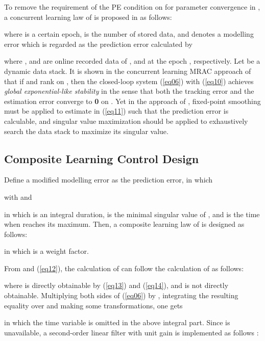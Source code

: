 \documentclass[conference]{IEEEtran}
\begin{document}
To remove the requirement of the PE condition on  for parameter convergence in \cite{Ioannou1996}, a concurrent learning law of  is proposed in \cite{Chowdhary2010a} as follows:

where  is a certain epoch,  is the number of stored data, and  denotes a modelling error which is regarded as the prediction error calculated by

where ,  and  are online recorded data of ,  and  at the epoch , respectively. Let   be a dynamic data stack. It is shown in the concurrent learning MRAC approach of \cite{Chowdhary2010a} that if   and rank on , then the closed-loop system (\ref{eq06}) with (\ref{eq10}) achieves \emph{global exponential-like stability} in the sense that both the tracking error  and the estimation error  converge to \textbf{0} on . Yet in the approach of \cite{Chowdhary2010a}, fixed-point smoothing must be applied to estimate  in (\ref{eq11}) such that the prediction error  is calculable, and singular value maximization should be applied to exhaustively search the data stack  to maximize its singular value.

\subsection{Composite Learning Control Design}

Define a modified modelling error  as the prediction error, in which

with  and

in which  is an integral duration,  is the minimal singular value of , and  is the time when  reaches its maximum\footnotemark[1]. Then, a composite learning law of  is designed as follows:

in which  is a weight factor.


From  and (\ref{eq12}), the calculation of  can follow the calculation of  as follows:

where  is directly obtainable by (\ref{eq13}) and (\ref{eq14}), and  is not directly obtainable. Multiplying both sides of (\ref{eq06}) by , int\-egrating the resulting equality over  and making some transformations, one gets

in which the time variable  is omitted in the above integral part. Since  is unavailable, a second-order linear filter with unit gain is implemented as follows \cite{Hu2013}:
\end{document}
